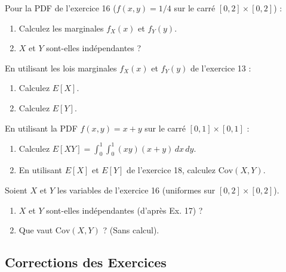 \begin{exercicebox}
Pour la PDF de l'exercice 16 ($f(x,y) = 1/4$ sur le carré $[0,2]\times[0,2]$) :
\begin{enumerate}
    \item Calculez les marginales $f_X(x)$ et $f_Y(y)$.
    \item $X$ et $Y$ sont-elles indépendantes ?
\end{enumerate}
\end{exercicebox}


\begin{exercicebox}
En utilisant les lois marginales $f_X(x)$ et $f_Y(y)$ de l'exercice 13 :
\begin{enumerate}
    \item Calculez $E[X]$.
    \item Calculez $E[Y]$.
\end{enumerate}
\end{exercicebox}

\begin{exercicebox}
En utilisant la PDF $f(x,y) = x+y$ sur le carré $[0,1]\times[0,1]$ :
\begin{enumerate}
    \item Calculez $E[XY] = \int_0^1 \int_0^1 (xy)(x+y) \, dx \, dy$.
    \item En utilisant $E[X]$ et $E[Y]$ de l'exercice 18, calculez $\text{Cov}(X, Y)$.
\end{enumerate}
\end{exercicebox}

\begin{exercicebox}
Soient $X$ et $Y$ les variables de l'exercice 16 (uniformes sur $[0, 2] \times [0, 2]$).
\begin{enumerate}
    \item $X$ et $Y$ sont-elles indépendantes (d'après Ex. 17) ?
    \item Que vaut $\text{Cov}(X, Y)$ ? (Sans calcul).
\end{enumerate}
\end{exercicebox}

\subsection{Corrections des Exercices}

